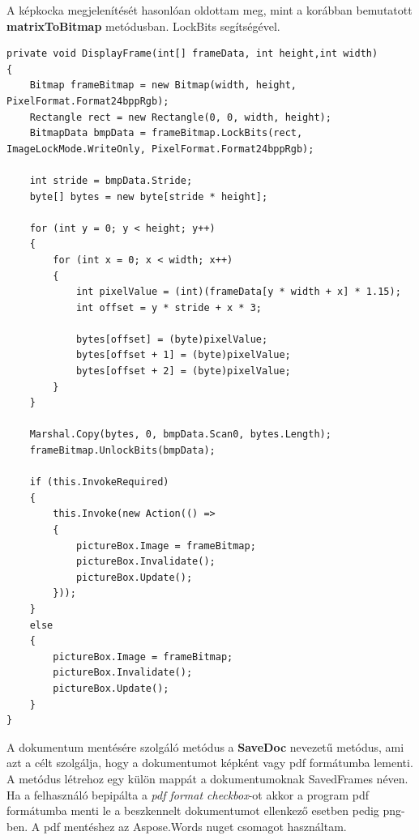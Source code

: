 \documentclass[]{thesis-ekf}
\theoremstyle{definition}
\theoremstyle{remark}
\begin{document}
A képkocka megjelenítését hasonlóan oldottam meg, mint a korábban bemutatott \textbf{matrixToBitmap} metódusban. LockBits segítségével.
\begin{lstlisting}[language=CSharp]
private void DisplayFrame(int[] frameData, int height,int width)
{
	Bitmap frameBitmap = new Bitmap(width, height, PixelFormat.Format24bppRgb);
	Rectangle rect = new Rectangle(0, 0, width, height);
	BitmapData bmpData = frameBitmap.LockBits(rect, ImageLockMode.WriteOnly, PixelFormat.Format24bppRgb);
	
	int stride = bmpData.Stride;
	byte[] bytes = new byte[stride * height];
	
	for (int y = 0; y < height; y++)
	{
		for (int x = 0; x < width; x++)
		{
			int pixelValue = (int)(frameData[y * width + x] * 1.15);
			int offset = y * stride + x * 3;
			
			bytes[offset] = (byte)pixelValue;         
			bytes[offset + 1] = (byte)pixelValue;     
			bytes[offset + 2] = (byte)pixelValue;     
		}
	}
	
	Marshal.Copy(bytes, 0, bmpData.Scan0, bytes.Length);
	frameBitmap.UnlockBits(bmpData);
	
	if (this.InvokeRequired)
	{
		this.Invoke(new Action(() =>
		{
			pictureBox.Image = frameBitmap;
			pictureBox.Invalidate();
			pictureBox.Update();
		}));
	}
	else
	{
		pictureBox.Image = frameBitmap;
		pictureBox.Invalidate();
		pictureBox.Update();
	}
}	
\end{lstlisting}
A dokumentum mentésére szolgáló metódus a \textbf{SaveDoc} nevezetű metódus, ami azt a célt szolgálja, hogy a dokumentumot képként vagy pdf formátumba lementi. A metódus létrehoz egy külön mappát a dokumentumoknak SavedFrames néven. Ha a felhasználó bepipálta a \emph{pdf format checkbox}-ot akkor a program pdf formátumba menti le a beszkennelt dokumentumot ellenkező esetben pedig png-ben. A pdf mentéshez az Aspose.Words\cite{aspose.word} nuget csomagot használtam.
\end{document}
